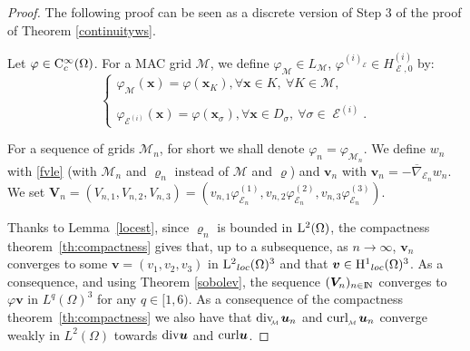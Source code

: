 \documentclass{amsart}
\numberwithin{equation}{section}
\begin{document}
\begin{proof}

The following proof can be seen as a discrete version of Step 3 of the proof of Theorem \ref{continuityws}.

Let $\varphi \in {{\rm C}}^\infty_c(\Omega)$.
For a MAC grid ${{\mathcal M}}$, we define $\varphi_{{\mathcal M}} \in L_{{\mathcal M}}$,  $\varphi^{(i)}_\operatorname{{\mathcal{E}}} \in H_{\operatorname{{\mathcal{E}}},0}^{(i)}$ by:
\begin{equation*}
\left\{
\begin{array}{l}
 \varphi_{{\mathcal M}} ({{\boldsymbol x}}) = \varphi ({{\boldsymbol x}}_K), \forall {{\boldsymbol x}} \in K, \ \forall K \in {{\mathcal M}}, \\ \\
  \varphi_\operatorname{{\mathcal{E}}}^{(i)} ({{\boldsymbol x}}) = \varphi ({{\boldsymbol x}}_{{\sigma}}), \forall {{\boldsymbol x}} \in D_{{\sigma}}, \ \forall {{\sigma}} \in \operatorname{{\mathcal{E}}}^{(i)}.
\end{array}
\right.
\end{equation*}

For a sequence of grids ${{\mathcal M}}_n$, for short we shall denote $\varphi_n = \varphi_{{{\mathcal M}}_n}$.
We define $w_n$ with \eqref{fvle} (with ${{\mathcal M}}_n$ and ${\varrho}_n$ instead of ${{\mathcal M}}$ and ${\varrho}$) and ${{\boldsymbol v}}_n$ with $ {\bm{v}}_n = -{{\overline \nabla}}_{\operatorname{{\mathcal{E}}}_n} w_n $.
We set $ {\bm{V}}_n =(V_{n,1},V_{n,2},V_{n,3})= ( v_{n,1} \varphi_{\operatorname{{\mathcal{E}}}_n}^{(1)},v_{n,2} \varphi_{\operatorname{{\mathcal{E}}}_n}^{(2)} ,v_{n,3} \varphi_{\operatorname{{\mathcal{E}}}_n}^{(3)}) $.

Thanks to Lemma~\ref{locest}, since ${\varrho}_n$ is bounded in ${{\rm L}^{2}}(\Omega)$, the compactness theorem~\ref{th:compactness} gives that, up to a subsequence, as $n {\rightarrow} \infty$, ${{\boldsymbol v}}_n$ converges to some ${{\boldsymbol v}}=(v_1,v_2,v_3)$ in ${{\rm L}^{2}}_{loc}(\Omega)^3$ and that ${{\boldsymbol v}} \in {{\rm H}^{1}}_{loc}(\Omega)^3$. As a consequence, and using  Theorem \ref{sobolev}, the sequence $({\bm{V}}_n)_{{n \in {\ifmmode{\rm	I\mkern-3.1mu
N\mkern0.5mu}\else{\rm I\kern-.16em
N\hskip0.5pt\ }\fi\relax}}} $ converges to $ \varphi {\bm{v}} $ in $ L^q(\Omega)^3 $ for any $ q \in [1,6)$.
As a consequence of the compactness theorem~\ref{th:compactness} we also have that ${{\rm div}_{\hspace{-0.2em}\raisebox{-0.1em}{\scalebox{0.5}{${{\mathcal M}}$}}}} \, {{\boldsymbol u}}_n$ and ${{\rm curl}_{\raisebox{-0.1em}{\scalebox{0.5}{${{\mathcal M}}$}}}} \, {{\boldsymbol u}}_n$ converge weakly in $L^2(\Omega)$ towards ${{\rm div}} {{\boldsymbol u}}$ and ${{\rm curl}} {{\boldsymbol u}}$.


\end{proof}
\end{document}
